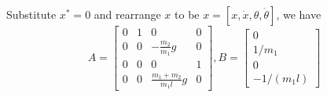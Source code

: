 Substitute  $x^\ast=0$ and rearrange $x$ to be $x=[x,\dot{x},\theta,\dot{\theta}]$, we have
\begin{equation}
    A = \left[ \begin{array}{cccc}
        0 & 1 & 0 & 0 \\ 
        0 & 0 & -\frac{m_2}{m_1}g & 0 \\ 
        0 & 0 & 0 & 1 \\
        0 & 0 & \frac{m_1+m_2}{m_1l}g & 0 
        \end{array} \right], B = \left[ \begin{array}{c}
            0 \\ 
            1/m_1 \\
            0 \\
            -1/(m_1l)
            \end{array} \right]
\end{equation}